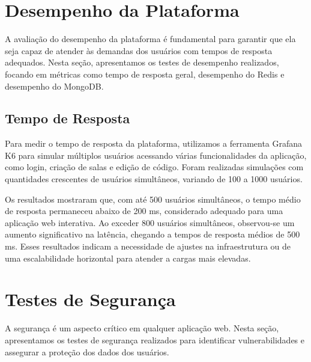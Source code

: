 


\section{Desempenho da Plataforma}

A avaliação do desempenho da plataforma é fundamental para garantir que ela seja capaz de atender às demandas dos usuários com tempos de resposta adequados. Nesta seção, apresentamos os testes de desempenho realizados, focando em métricas como tempo de resposta geral, desempenho do Redis e desempenho do MongoDB.

\subsection{Tempo de Resposta}

Para medir o tempo de resposta da plataforma, utilizamos a ferramenta Grafana K6 para simular múltiplos usuários acessando várias funcionalidades da aplicação, como login, criação de salas e edição de código. Foram realizadas simulações com quantidades crescentes de usuários simultâneos, variando de 100 a 1000 usuários.

Os resultados mostraram que, com até 500 usuários simultâneos, o tempo médio de resposta permaneceu abaixo de 200 ms, considerado adequado para uma aplicação web interativa. Ao exceder 800 usuários simultâneos, observou-se um aumento significativo na latência, chegando a tempos de resposta médios de 500 ms. Esses resultados indicam a necessidade de ajustes na infraestrutura ou de uma escalabilidade horizontal para atender a cargas mais elevadas.

\section{Testes de Segurança}

A segurança é um aspecto crítico em qualquer aplicação web. Nesta seção, apresentamos os testes de segurança realizados para identificar vulnerabilidades e assegurar a proteção dos dados dos usuários.

